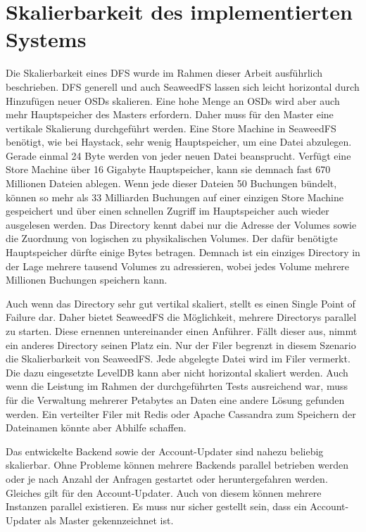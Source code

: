 \documentclass[12pt,oneside,a4paper,parskip]{scrbook}
\begin{document}
\section{Skalierbarkeit des implementierten Systems}
Die Skalierbarkeit eines DFS wurde im Rahmen dieser Arbeit ausführlich beschrieben. DFS generell und auch SeaweedFS lassen sich leicht horizontal durch Hinzufügen neuer OSDs skalieren. Eine hohe Menge an OSDs wird aber auch mehr Hauptspeicher des Masters erfordern. Daher muss für den Master eine vertikale Skalierung durchgeführt werden. Eine Store Machine in SeaweedFS benötigt, wie bei Haystack, sehr wenig Hauptspeicher, um eine Datei abzulegen. Gerade einmal 24 Byte werden von jeder neuen Datei beansprucht. Verfügt eine Store Machine über 16 Gigabyte Hauptspeicher, kann sie demnach fast 670 Millionen Dateien ablegen.
Wenn jede dieser Dateien 50 Buchungen bündelt, können so mehr als 33 Milliarden Buchungen auf einer einzigen Store Machine gespeichert und über einen schnellen Zugriff im Hauptspeicher auch wieder ausgelesen werden. Das Directory kennt dabei nur die Adresse der Volumes sowie die Zuordnung von logischen zu physikalischen Volumes. Der dafür benötigte Hauptspeicher dürfte einige Bytes betragen. Demnach ist ein einziges Directory in der Lage mehrere tausend Volumes zu adressieren, wobei jedes Volume mehrere Millionen Buchungen speichern kann.

Auch wenn das Directory sehr gut vertikal skaliert, stellt es einen Single Point of Failure dar. Daher bietet SeaweedFS die Möglichkeit, mehrere Directorys parallel zu starten. Diese ernennen untereinander einen Anführer. Fällt dieser aus, nimmt ein anderes Directory seinen Platz ein. Nur der Filer begrenzt in diesem Szenario die Skalierbarkeit von SeaweedFS. Jede abgelegte Datei wird im Filer vermerkt. Die dazu eingesetzte LevelDB kann aber nicht horizontal skaliert werden. Auch wenn die Leistung im Rahmen der durchgeführten Tests ausreichend war, muss für die Verwaltung mehrerer Petabytes an Daten eine andere Lösung gefunden werden. Ein verteilter Filer mit Redis oder Apache Cassandra zum Speichern der Dateinamen könnte aber Abhilfe schaffen. 

Das entwickelte Backend sowie der Account-Updater sind nahezu beliebig skalierbar. Ohne Probleme können mehrere Backends parallel betrieben werden oder je nach Anzahl der Anfragen gestartet oder heruntergefahren werden. Gleiches gilt für den Account-Updater. Auch von diesem können mehrere Instanzen parallel existieren. Es muss nur sicher gestellt sein, dass ein Account-Updater als Master gekennzeichnet ist. 
\end{document}
